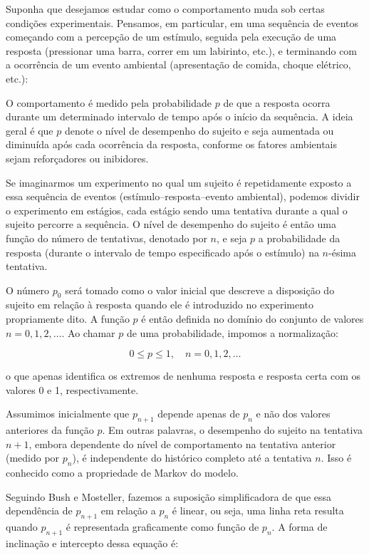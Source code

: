\documentclass{article}
\begin{document}
Suponha que desejamos estudar como o comportamento muda sob certas condições experimentais. Pensamos, em particular, em uma sequência de eventos começando com a percepção de um estímulo, seguida pela execução de uma resposta (pressionar uma barra, correr em um labirinto, etc.), e terminando com a ocorrência de um evento ambiental (apresentação de comida, choque elétrico, etc.):

O comportamento é medido pela probabilidade $p$ de que a resposta ocorra durante um determinado intervalo de tempo após o início da sequência. A ideia geral é que $p$ denote o nível de desempenho do sujeito e seja aumentada ou diminuída após cada ocorrência da resposta, conforme os fatores ambientais sejam reforçadores ou inibidores.

Se imaginarmos um experimento no qual um sujeito é repetidamente exposto a essa sequência de eventos (estímulo–resposta–evento ambiental), podemos dividir o experimento em estágios, cada estágio sendo uma tentativa durante a qual o sujeito percorre a sequência. O nível de desempenho do sujeito é então uma função do número de tentativas, denotado por $n$, e seja $p$ a probabilidade da resposta (durante o intervalo de tempo especificado após o estímulo) na $n$-ésima tentativa.

O número $p_0$ será tomado como o valor inicial que descreve a disposição do sujeito em relação à resposta quando ele é introduzido no experimento propriamente dito. A função $p$ é então definida no domínio do conjunto de valores $n = 0, 1, 2, \ldots$. Ao chamar $p$ de uma probabilidade, impomos a normalização:

\begin{equation}
0 \leq p \leq 1, \quad n = 0, 1, 2, \ldots
\tag{2.95}
\end{equation}

o que apenas identifica os extremos de nenhuma resposta e resposta certa com os valores 0 e 1, respectivamente.

Assumimos inicialmente que $p_{n+1}$ depende apenas de $p_n$ e não dos valores anteriores da função $p$. Em outras palavras, o desempenho do sujeito na tentativa $n+1$, embora dependente do nível de comportamento na tentativa anterior (medido por $p_n$), é independente do histórico completo até a tentativa $n$. Isso é conhecido como a propriedade de Markov do modelo.

Seguindo Bush e Mosteller, fazemos a suposição simplificadora de que essa dependência de $p_{n+1}$ em relação a $p_n$ é linear, ou seja, uma linha reta resulta quando $p_{n+1}$ é representada graficamente como função de $p_n$. A forma de inclinação e intercepto dessa equação é:
\end{document}
